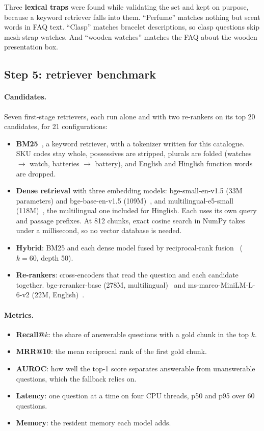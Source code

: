 \documentclass[11pt,a4paper]{article}
\begin{document}
Three \textbf{lexical traps} were found while validating the set and kept on purpose, because a keyword retriever
falls into them. ``Perfume'' matches nothing but scent words in FAQ text. ``Clasp'' matches bracelet descriptions,
so clasp questions skip mesh-strap watches. And ``wooden watches'' matches the FAQ about the wooden presentation box.

\subsection{Step 5: retriever benchmark}\label{sec:benchmethod}
\paragraph{Candidates.} Seven first-stage retrievers, each run alone and with two re-rankers on its top 20 candidates,
for 21 configurations:
\begin{itemize}
  \item \textbf{BM25}~\cite{bm25}, a keyword retriever, with a tokenizer written for this catalogue. SKU codes stay
        whole, possessives are stripped, plurals are folded (watches $\rightarrow$ watch, batteries $\rightarrow$
        battery), and English and Hinglish function words are dropped.
  \item \textbf{Dense retrieval} with three embedding models: bge-small-en-v1.5 (33M parameters) and bge-base-en-v1.5
        (109M)~\cite{bge}, and multilingual-e5-small (118M)~\cite{e5}, the multilingual one included for Hinglish.
        Each uses its own query and passage prefixes. At 812 chunks, exact cosine search in NumPy takes under a
        millisecond, so no vector database is needed.
  \item \textbf{Hybrid}: BM25 and each dense model fused by reciprocal-rank fusion~\cite{rrf} ($k=60$, depth 50).
  \item \textbf{Re-rankers}: cross-encoders that read the question and each candidate together.
        bge-reranker-base (278M, multilingual)~\cite{bge} and ms-marco-MiniLM-L-6-v2 (22M, English)~\cite{minilm,msmarco}.
\end{itemize}

\paragraph{Metrics.}
\begin{itemize}
  \item \textbf{Recall@$k$}: the share of answerable questions with a gold chunk in the top $k$.
  \item \textbf{MRR@10}: the mean reciprocal rank of the first gold chunk.
  \item \textbf{AUROC}: how well the top-1 score separates answerable from unanswerable questions, which the fallback
        relies on.
  \item \textbf{Latency}: one question at a time on four CPU threads, p50 and p95 over 60 questions.
  \item \textbf{Memory}: the resident memory each model adds.
\end{itemize}
\end{document}
